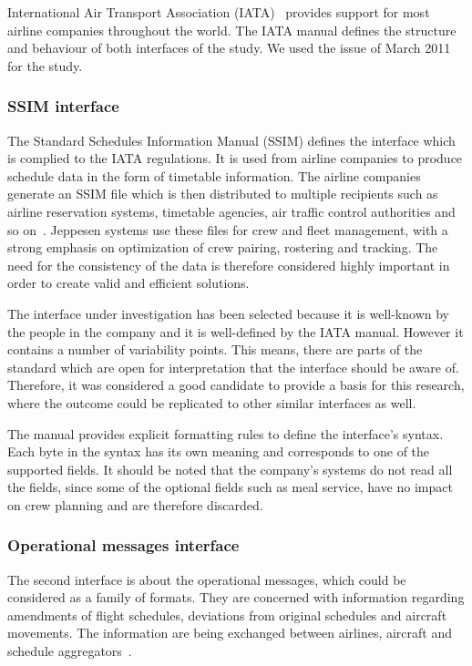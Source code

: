 International Air Transport Association (IATA)~\cite{IATA} provides support for most airline companies throughout the world. The IATA manual defines the structure and behaviour of both interfaces of the study. We used the issue of March 2011 for the study. 


\subsubsection{SSIM interface}
The Standard Schedules Information Manual (SSIM) defines the interface which is complied to the IATA regulations. It is used from airline companies to produce schedule data in the form of timetable information. The airline companies generate an SSIM file which is then distributed to multiple recipients such as airline reservation systems, timetable agencies, air traffic control authorities and so on~\cite{IATA}.
Jeppesen systems use these files for crew and fleet management, with a strong emphasis on optimization of crew pairing, rostering and tracking. The need for the consistency of the data is therefore considered highly important in order to create valid and efficient solutions.



The interface under investigation has been selected because it is  well-known by the people in the company and it is well-defined by the IATA manual. However it contains a number of variability points. This means, there are parts of the standard which are open for interpretation that the interface should be aware of. Therefore, it was considered a good candidate to provide a basis for this research, where the outcome could be replicated to other similar interfaces as well. 

The manual provides explicit formatting rules to define the interface's syntax. Each byte in the syntax has its own meaning and corresponds to one of the supported fields. It should be noted that the company's systems do not read all the fields, since some of the optional fields such as meal service, have no impact on crew planning and are therefore discarded.


\subsubsection{Operational messages interface}

The second interface is about the operational messages, which could be considered as a family of formats. They are concerned with information regarding amendments of flight schedules, deviations from original schedules and aircraft movements. 
The information are being exchanged between airlines, aircraft and schedule aggregators~\cite{IATA}. %


